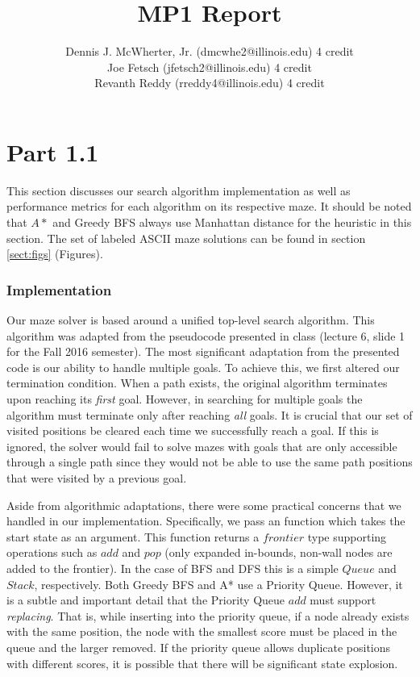 \documentclass{article}
\begin{document}
\title{MP1 Report}
\author{Dennis J. McWherter, Jr. (dmcwhe2@illinois.edu) 4 credit \\
        Joe Fetsch (jfetsch2@illinois.edu) 4 credit\\
        Revanth Reddy (rreddy4@illinois.edu) 4 credit}

\maketitle

\section{Part 1.1}
This section discusses our search algorithm implementation as well as performance metrics for each algorithm on its respective maze. It should be noted that $A*$ and Greedy BFS always use Manhattan distance for the heuristic in this section. The set of labeled ASCII maze solutions can be found in section \ref{sect:figs} (Figures).

\subsubsection{Implementation}

Our maze solver is based around a unified top-level search algorithm. This algorithm was adapted from the pseudocode presented in class (lecture 6, slide 1 for the Fall 2016 semester). The most significant adaptation from the presented code is our ability to handle multiple goals. To achieve this, we first altered our termination condition. When a path exists, the original algorithm terminates upon reaching its \emph{first} goal. However, in searching for multiple goals the algorithm must terminate only after reaching \emph{all} goals. It is crucial that our set of visited positions be cleared each time we successfully reach a goal. If this is ignored, the solver would fail to solve mazes with goals that are only accessible through a single path since they would not be able to use the same path positions that were visited by a previous goal.

Aside from algorithmic adaptations, there were some practical concerns that we handled in our implementation. Specifically, we pass an  function which takes the start state as an argument. This function returns a $frontier$ type supporting operations such as $add$ and $pop$ (only expanded in-bounds, non-wall nodes are added to the frontier). In the case of BFS and DFS this is a simple $Queue$ and $Stack$, respectively. Both Greedy BFS and A* use a Priority Queue. However, it is a subtle and important detail that the Priority Queue $add$ must support \emph{replacing}. That is, while inserting into the priority queue, if a node already exists with the same position, the node with the smallest score must be placed in the queue and the larger removed. If the priority queue allows duplicate positions with different scores, it is possible that there will be significant state explosion.
\end{document}
